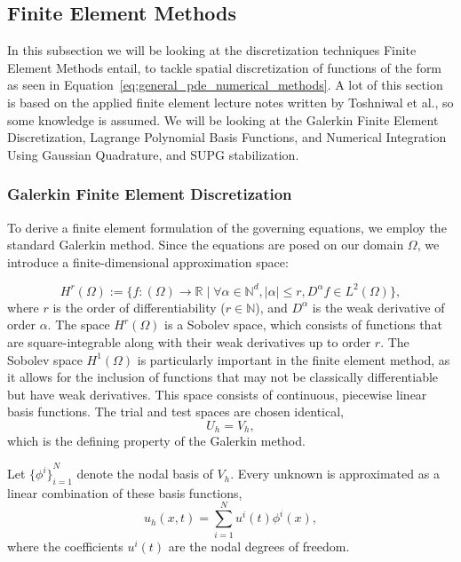 \subsection{Finite Element Methods}\label{subseq:finite_element_methods}

In this subsection we will be looking at the discretization techniques Finite Element Methods entail, to tackle spatial discretization of functions of the form as seen in Equation~\ref{eq:general_pde_numerical_methods}. A lot of this section is based on the applied finite element lecture notes written by Toshniwal et al.\cite{toshniwal2024afe}, so some knowledge is assumed. We will be looking at the Galerkin Finite Element Discretization, Lagrange Polynomial Basis Functions, and Numerical Integration Using Gaussian Quadrature, and SUPG stabilization.

\subsubsection{Galerkin Finite Element Discretization}

To derive a finite element formulation of the governing equations, we employ the standard Galerkin method. Since the equations are posed on our domain $\Omega$, we introduce a finite-dimensional approximation space:

\begin{equation}
H^r(\Omega) := \bigg\{ f:(\Omega)\to \mathbb{R} \mid \forall \alpha \in \mathbb{N}^d, |\alpha| \leq r, D^\alpha f \in L^2(\Omega) \bigg\},
\end{equation}
where $r$ is the order of differentiability ($r \in \mathbb{N}$), and $D^\alpha$ is the weak derivative of order $\alpha$. The space $H^r(\Omega)$ is a Sobolev space, which consists of functions that are square-integrable along with their weak derivatives up to order $r$. The Sobolev space $H^1(\Omega)$ is particularly important in the finite element method, as it allows for the inclusion of functions that may not be classically differentiable but have weak derivatives. This space consists of continuous, piecewise linear basis functions. The trial and test spaces are chosen identical,
\begin{equation}
U_h=V_h,
\end{equation}
which is the defining property of the Galerkin method.

Let ${\{\phi^i\}}_{i=1}^{N}$ denote the nodal basis of $V_h$. Every unknown is approximated as a linear combination of these basis functions,
\[
u_h(x,t)=\sum_{i=1}^{N}u^i(t)\phi^i(x),
\]
where the coefficients $u^i(t)$ are the nodal degrees of freedom.

